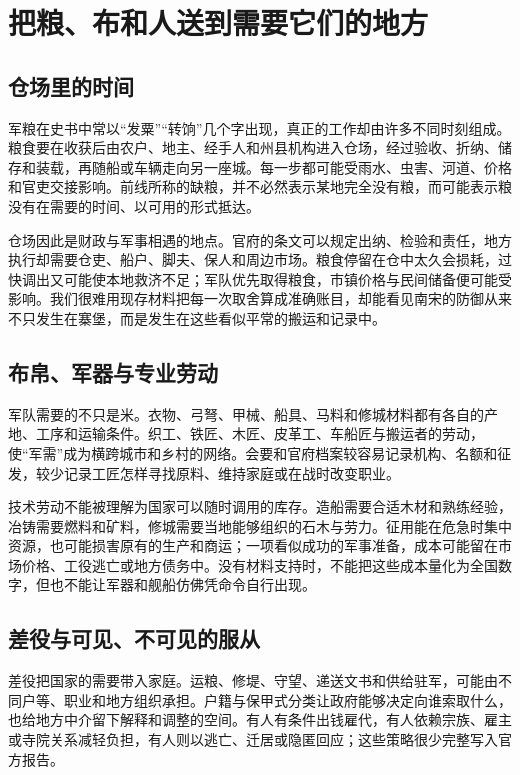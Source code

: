 \section{把粮、布和人送到需要它们的地方}

\subsection{仓场里的时间}

军粮在史书中常以“发粟”“转饷”几个字出现，真正的工作却由许多不同时刻组成。粮食要在收获后由农户、地主、经手人和州县机构进入仓场，经过验收、折纳、储存和装载，再随船或车辆走向另一座城。每一步都可能受雨水、虫害、河道、价格和官吏交接影响。前线所称的缺粮，并不必然表示某地完全没有粮，而可能表示粮没有在需要的时间、以可用的形式抵达。

仓场因此是财政与军事相遇的地点。官府的条文可以规定出纳、检验和责任，地方执行却需要仓吏、船户、脚夫、保人和周边市场。粮食停留在仓中太久会损耗，过快调出又可能使本地救济不足；军队优先取得粮食，市镇价格与民间储备便可能受影响。我们很难用现存材料把每一次取舍算成准确账目，却能看见南宋的防御从来不只发生在寨堡，而是发生在这些看似平常的搬运和记录中。

\subsection{布帛、军器与专业劳动}

军队需要的不只是米。衣物、弓弩、甲械、船具、马料和修城材料都有各自的产地、工序和运输条件。织工、铁匠、木匠、皮革工、车船匠与搬运者的劳动，使“军需”成为横跨城市和乡村的网络。会要和官府档案较容易记录机构、名额和征发，较少记录工匠怎样寻找原料、维持家庭或在战时改变职业。

技术劳动不能被理解为国家可以随时调用的库存。造船需要合适木材和熟练经验，冶铸需要燃料和矿料，修城需要当地能够组织的石木与劳力。征用能在危急时集中资源，也可能损害原有的生产和商运；一项看似成功的军事准备，成本可能留在市场价格、工役逃亡或地方债务中。没有材料支持时，不能把这些成本量化为全国数字，但也不能让军器和舰船仿佛凭命令自行出现。

\subsection{差役与可见、不可见的服从}

差役把国家的需要带入家庭。运粮、修堤、守望、递送文书和供给驻军，可能由不同户等、职业和地方组织承担。户籍与保甲式分类让政府能够决定向谁索取什么，也给地方中介留下解释和调整的空间。有人有条件出钱雇代，有人依赖宗族、雇主或寺院关系减轻负担，有人则以逃亡、迁居或隐匿回应；这些策略很少完整写入官方报告。

